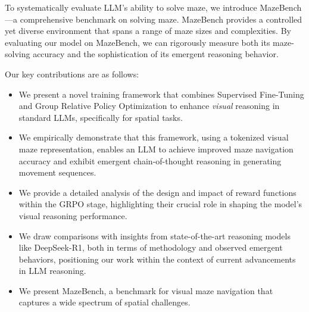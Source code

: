 To systematically evaluate LLM's ability to solve maze, we introduce MazeBench—a comprehensive benchmark on solving maze. MazeBench provides a controlled yet diverse environment that spans a range of maze sizes and complexities. By evaluating our model on MazeBench, we can rigorously measure both its maze-solving accuracy and the sophistication of its emergent reasoning behavior.

Our key contributions are as follows:

\begin{itemize}
    \item We present a novel training framework that combines Supervised Fine-Tuning and Group Relative Policy Optimization to enhance \textit{visual} reasoning in standard LLMs, specifically for spatial tasks.
    \item We empirically demonstrate that this framework, using a tokenized visual maze representation, enables an LLM to achieve improved maze navigation accuracy and exhibit emergent chain-of-thought reasoning in generating movement sequences.
    \item We provide a detailed analysis of the design and impact of reward functions within the GRPO stage, highlighting their crucial role in shaping the model's visual reasoning performance.
    \item We draw comparisons with insights from state-of-the-art reasoning models like DeepSeek-R1, both in terms of methodology and observed emergent behaviors, positioning our work within the context of current advancements in LLM reasoning.
    \item We present MazeBench, a benchmark for visual maze navigation that captures a wide spectrum of spatial challenges.
\end{itemize}
